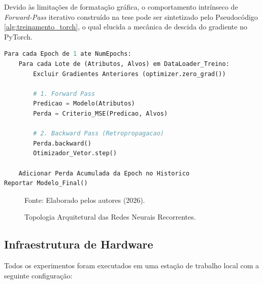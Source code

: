 Devido às limitações de formatação gráfica, o comportamento intrínseco de \textit{Forward-Pass} iterativo construído na tese pode ser sintetizado pelo Pseudocódigo \ref{alg:treinamento_torch}, o qual elucida a mecânica de descida do gradiente no PyTorch.

\begin{lstlisting}[language=Python, caption={Pseudocódigo Fundamental do Loop de Otimização Neural}, label={alg:treinamento_torch}]
Para cada Epoch de 1 ate NumEpochs:
    Para cada Lote de (Atributos, Alvos) em DataLoader_Treino:
        Excluir Gradientes Anteriores (optimizer.zero_grad())
        
        # 1. Forward Pass
        Predicao = Modelo(Atributos)
        Perda = Criterio_MSE(Predicao, Alvos)
        
        # 2. Backward Pass (Retropropagacao)
        Perda.backward()
        Otimizador_Vetor.step()
        
    Adicionar Perda Acumulada da Epoch no Historico
Reportar Modelo_Final()
\end{lstlisting}

\begin{figure}[H]
\centering
{}
\caption{Topologia Arquitetural das Redes Neurais Recorrentes.}
\small{Fonte: Elaborado pelos autores (2026).}
\label{fig:topologia_neural}
\end{figure}

\subsection{Infraestrutura de Hardware}\label{sec:hardware}
Todos os experimentos foram executados em uma estação de trabalho local com a seguinte configuração:

